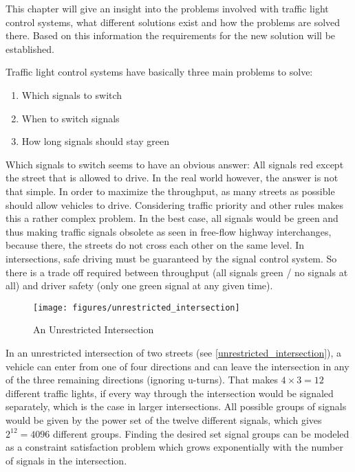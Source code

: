This chapter will give an insight into the problems involved with traffic light control systems, what different solutions exist and how the problems are solved there. Based on this information the requirements for the new solution will be established.

Traffic light control systems have basically three main problems to solve:

\begin{enumerate}
	\item Which signals to switch
	\item When to switch signals
	\item How long signals should stay green
\end{enumerate}

Which signals to switch seems to have an obvious answer: All signals red except the street that is allowed to drive. In the real world however, the answer is not that simple. In order to maximize the throughput, as many streets as possible should allow vehicles to drive. Considering traffic priority and other rules makes this a rather complex problem. In the best case, all signals would be green and thus making traffic signals obsolete as seen in free-flow highway interchanges, because there, the streets do not cross each other on the same level. In intersections, safe driving must be guaranteed by the signal control system. So there is a trade off required between throughput (all signals green / no signals at all) and driver safety (only one green signal at any given time). \cite{intersection_collision_avoidance}

\begin{figure}[ht]
	\centering
	\texttt{[image: figures/unrestricted\_intersection]}
	\caption{An Unrestricted Intersection}
	\label{unrestricted_intersection}
\end{figure}

In an unrestricted intersection of two streets (see \autoref{unrestricted_intersection}), a vehicle can enter from one of four directions and can leave the intersection in any of the three remaining directions (ignoring u-turns). That makes $4 \times 3 = 12$ different traffic lights, if every way through the intersection would be signaled separately, which is the case in larger intersections. All possible groups of signals would be given by the power set of the twelve different signals, which gives $2^{12} = 4096$ different groups. Finding the desired set signal groups can be modeled as a constraint satisfaction problem which grows exponentially with the number of signals in the intersection.

